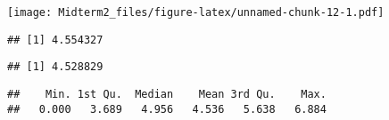 \documentclass[]{article}
\newenvironment{Shaded}{\begin{snugshade}}{\end{snugshade}}
\newcommand{\KeywordTok}[1]{\textcolor[rgb]{0.13,0.29,0.53}{\textbf{#1}}}
\newcommand{\DecValTok}[1]{\textcolor[rgb]{0.00,0.00,0.81}{#1}}
\newcommand{\StringTok}[1]{\textcolor[rgb]{0.31,0.60,0.02}{#1}}
\newcommand{\CommentTok}[1]{\textcolor[rgb]{0.56,0.35,0.01}{\textit{#1}}}
\newcommand{\OperatorTok}[1]{\textcolor[rgb]{0.81,0.36,0.00}{\textbf{#1}}}
\newcommand{\NormalTok}[1]{#1}
\begin{document}
\texttt{[image: Midterm2\_files/figure-latex/unnamed-chunk-12-1.pdf]}

\begin{Shaded}
\end{Shaded}

\begin{verbatim}
## [1] 4.554327
\end{verbatim}

\begin{Shaded}
\end{Shaded}

\begin{verbatim}
## [1] 4.528829
\end{verbatim}

\begin{Shaded}
\end{Shaded}

\begin{verbatim}
##    Min. 1st Qu.  Median    Mean 3rd Qu.    Max. 
##   0.000   3.689   4.956   4.536   5.638   6.884
\end{verbatim}

\begin{Shaded}
\end{Shaded}
\end{document}
